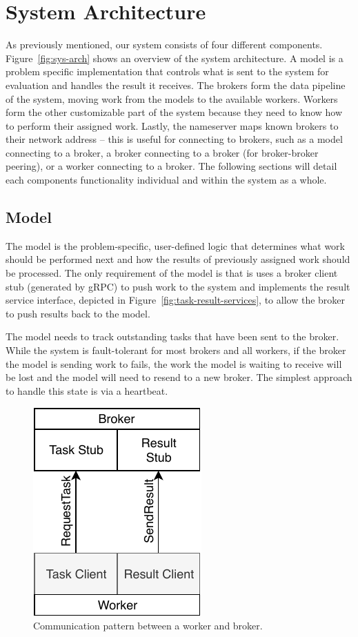 \documentclass[conference]{IEEEtran}
\begin{document}
\section{System Architecture}
As previously mentioned, our system consists of four different components.
Figure~\ref{fig:sys-arch} shows an overview of the system architecture.  A model
is a problem specific implementation that controls what is sent to the system
for evaluation and handles the result it receives. The brokers form the data
pipeline of the system, moving work from the models to the available workers.
Workers form the other
customizable part of the system because they need to know how to perform their
assigned work.  Lastly, the nameserver maps known brokers to their network
address -- this is useful for connecting to brokers, such as a model connecting
to a broker, a broker connecting to a broker (for broker-broker peering), or a
worker connecting to a broker. The following sections will detail each
components functionality individual and within the system as a whole.


\subsection{Model}
The model is the problem-specific, user-defined logic that determines what work
should be performed next and how the results of previously assigned work should
be processed. The only requirement of the model is that is uses a broker client
stub (generated by gRPC) to push work to the system and implements the result
service interface, depicted in Figure~\ref{fig:task-result-services}, to allow
the broker to push results back to the model.

The model needs to track outstanding tasks that have been sent to the broker.
While the system is fault-tolerant for most brokers and all workers, if the
broker the model is sending work to fails, the work the model is waiting to
receive will be lost and the model will need to resend to a new broker. The
simplest approach to handle this state is via a heartbeat.

\begin{figure}
  \centering
  \includegraphics{img/broker_worker}
  \caption{Communication pattern between a worker and broker.}
  \label{fig:worker-broker}
\end{figure}
\end{document}
